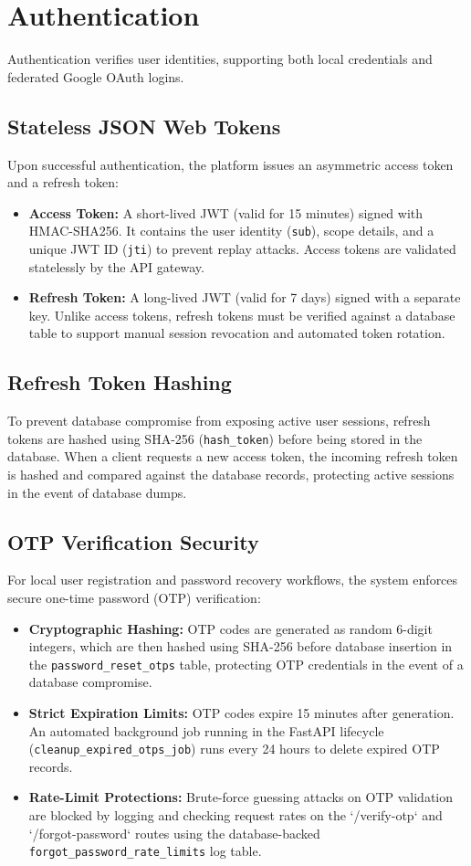 \section{Authentication}
Authentication verifies user identities, supporting both local credentials and federated Google OAuth logins.

\subsection{Stateless JSON Web Tokens}
Upon successful authentication, the platform issues an asymmetric access token and a refresh token:
\begin{itemize}
    \item \textbf{Access Token:} A short-lived JWT (valid for 15 minutes) signed with HMAC-SHA256. It contains the user identity (\texttt{sub}), scope details, and a unique JWT ID (\texttt{jti}) to prevent replay attacks. Access tokens are validated statelessly by the API gateway.
    \item \textbf{Refresh Token:} A long-lived JWT (valid for 7 days) signed with a separate key. Unlike access tokens, refresh tokens must be verified against a database table to support manual session revocation and automated token rotation.
\end{itemize}

\subsection{Refresh Token Hashing}
To prevent database compromise from exposing active user sessions, refresh tokens are hashed using SHA-256 (\texttt{hash\_token}) before being stored in the database. When a client requests a new access token, the incoming refresh token is hashed and compared against the database records, protecting active sessions in the event of database dumps.

\subsection{OTP Verification Security}
For local user registration and password recovery workflows, the system enforces secure one-time password (OTP) verification:
\begin{itemize}
    \item \textbf{Cryptographic Hashing:} OTP codes are generated as random 6-digit integers, which are then hashed using SHA-256 before database insertion in the \texttt{password\_reset\_otps} table, protecting OTP credentials in the event of a database compromise.
    \item \textbf{Strict Expiration Limits:} OTP codes expire 15 minutes after generation. An automated background job running in the FastAPI lifecycle (\texttt{cleanup\_expired\_otps\_job}) runs every 24 hours to delete expired OTP records.
    \item \textbf{Rate-Limit Protections:} Brute-force guessing attacks on OTP validation are blocked by logging and checking request rates on the `/verify-otp` and `/forgot-password` routes using the database-backed \texttt{forgot\_password\_rate\_limits} log table.
\end{itemize}

